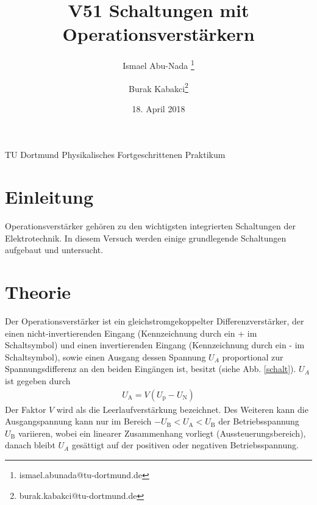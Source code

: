 \documentclass{scrartcl}
\title{V51 Schaltungen mit Operationsverstärkern}
\author{Ismael Abu-Nada \footnote{ismael.abunada@tu-dortmund.de}\and Burak Kabakci\footnote{burak.kabakci@tu-dortmund.de}}
\date{18. April 2018}
\begin{document}
	\maketitle
	\begin{center}
		TU Dortmund Physikalisches Fortgeschrittenen Praktikum
	\end{center}
	\thispagestyle{empty}
	\newpage
	\tableofcontents


\newpage

\section{Einleitung }

Operationsverstärker gehören zu den wichtigsten integrierten Schaltungen der Elektrotechnik. In diesem Versuch werden einige grundlegende Schaltungen aufgebaut und untersucht.

\section{Theorie}

Der Operationsverstärker ist ein gleichstromgekoppelter Differenzverstärker, der einen nicht-invertierenden Eingang (Kennzeichnung durch ein + im Schaltsymbol) und einen invertierenden Eingang (Kennzeichnung durch ein - im Schaltsymbol), sowie einen Ausgang dessen Spannung $U_A$ proportional zur Spannungsdifferenz an den beiden Eingängen ist, besitzt (siehe Abb. \ref{schalt}).
$U_A$ ist gegeben durch
\begin{align}
U_\mathrm{A} = V(U_\mathrm{p}-U_\mathrm{N})
\end{align}
Der Faktor $V$ wird als die Leerlaufverstärkung bezeichnet.
Des Weiteren kann die Ausgangspannung kann nur im Bereich $-U_\mathrm{B} < U_\mathrm{A} < U_\mathrm{B}$ der Betriebsspannung $U_\mathrm{B}$ variieren, wobei ein linearer Zusammenhang vorliegt (Aussteuerungsbereich), danach bleibt $U_A$ gesättigt auf der positiven oder negativen Betriebsspannung.

\end{document}
